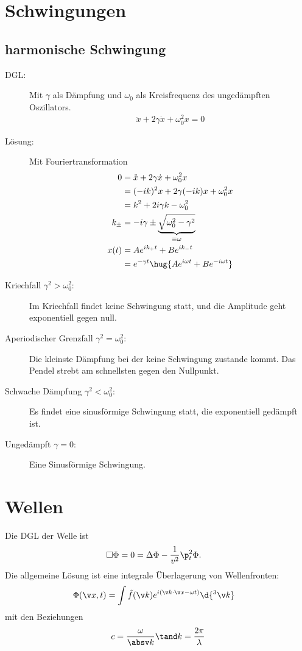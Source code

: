 \documentclass[twocolumn, bfvec]{summery_5.0}
\begin{document}
\section{Schwingungen}
\subsection{harmonische Schwingung}
\begin{description}
    \item[DGL:] Mit \(\gamma\) als Dämpfung und \(\omega_0\) als Kreisfrequenz des ungedämpften Oszillators.
    \begin{align*}
        \ddot x + 2\gamma \dot x + \omega_0^2 x = 0
    \end{align*}
    \item[Lösung:] Mit Fouriertransformation
    \begin{align*}
        0 &= \ddot x + 2\gamma \dot x + \omega_0^2 x\\
        &= (-ik)^2 x + 2\gamma (-ik) x + \omega_0^2 x\\
        &= k^2 + 2 i \gamma k - \omega_0^2 \\
        k_\pm &= - i \gamma \pm \underbrace{\sqrt{\omega_0^2 - \gamma^2}}_{\equiv \omega} \\
        x(t) 
        &= A e^{i k_+ t} + B e^{i k_- t}\\
        &= e^{-\gamma t}\hug{A e^{i \omega t} + B e^{-i \omega t}}
    \end{align*}
    \item[Kriechfall \(\gamma^2>\omega_0^2\):] Im Kriechfall findet keine Schwingung statt, und die Amplitude geht exponentiell gegen null.
    \item[Aperiodischer Grenzfall \(\gamma^2 = \omega_0^2\):] Die kleinste Dämpfung bei der keine Schwingung zustande kommt. Das Pendel strebt am schnellsten gegen den Nullpunkt.
    \item[Schwache Dämpfung \(\gamma^2<\omega_0^2\):] Es findet eine sinusförmige Schwingung statt, die exponentiell gedämpft ist. 
    \item[Ungedämpft \(\gamma=0\):] Eine Sinusförmige Schwingung.    
\end{description}


\section{Wellen}
Die DGL der Welle ist 
\begin{align*}
    \square \Phi &= 0 = \Delta \Phi  - \frac{1}{v^2}\p_t^2 \Phi.
\end{align*}
Die allgemeine Lösung ist eine integrale Überlagerung von Wellenfronten:
\begin{align*}
    \Phi(\v x, t) &= \int\tilde f(\v k) e^{i(\v k\cdot \v x - \omega t)} \d{^3\v k} 
\end{align*}
mit den Beziehungen
\begin{align*}
    c = \frac{\omega}{\absv k } \tand k=\frac{2\pi}\lambda
\end{align*}
\end{document}
